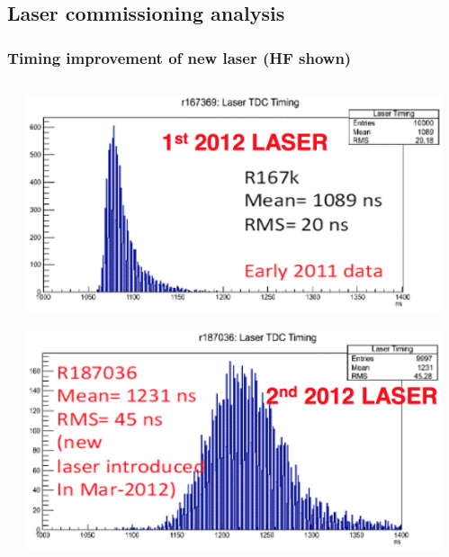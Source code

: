 \documentclass[bigger]{beamer}
\begin{document}
\subsection{Laser commissioning analysis}
\label{sec-4-2}
\begin{frame}
\frametitle{Timing improvement of new laser (HF shown)}
\label{sec-4-2-1}
\begin{columns} %
\label{sec-4-2-1-1}
\begin{column}{0.55\textwidth}
\label{sec-4-2-1-1-1}
\label{sec-4-2-1-1-1-1}

\centering
\includegraphics[width=\textwidth]{fig/laser/laser_2012_1.png}
\label{sec-4-2-1-1-1-2}

\centering
\includegraphics[width=\textwidth]{fig/laser/laser_2012_2.png}
\end{column}
\begin{column}{0.55\textwidth}
\label{sec-4-2-1-1-2}
\label{sec-4-2-1-1-2-1}


\end{column}
\end{columns}
\end{frame}
\end{document}

